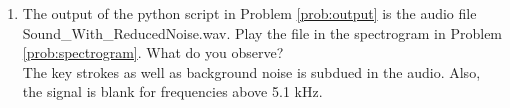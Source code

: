 \documentclass[journal,12pt,twocolumn]{IEEEtran}
\renewcommand\thesection{\arabic{section}}
\begin{document}
\begin{enumerate}[label=\thesection.\arabic*
,ref=\thesection.\theenumi]
\begin{lstlisting}
#write the output signal into .wav file
sf.write('Sound_With_ReducedNoise.wav', output_signal, fs)
\end{lstlisting}
%
%
\item
The output of the python script in Problem \ref{prob:output} is the audio file Sound\_With\_ReducedNoise.wav. Play the file in the spectrogram in Problem \ref{prob:spectrogram}. What do you observe?
\\
\solution The key strokes as well as background noise is subdued in the audio.  Also,  the signal is blank for frequencies above 5.1 kHz.

\end{enumerate}
\end{document}
